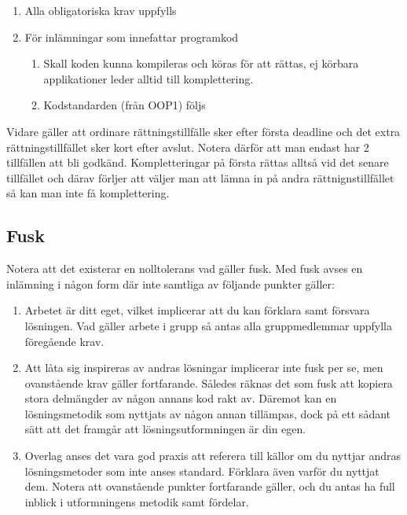 \documentclass{article}
\begin{document}
  \begin{enumerate}
    		\item Alla obligatoriska krav uppfylls
    		\item För inlämningar som innefattar programkod
    		\begin{enumerate}
    		 \item Skall koden kunna kompileras och köras för att rättas, ej körbara applikationer
    		 leder alltid till komplettering.
    		 \item Kodstandarden (från OOP1) följs
    		\end{enumerate}
    \end{enumerate}
    
    Vidare gäller att ordinare rättningstillfälle sker efter första deadline och det extra rättningstillfället sker kort efter avslut. Notera därför att man endast har 2 tillfällen att bli godkänd. Kompletteringar på första rättas alltså vid det senare tillfället och därav förljer att väljer man att lämna in på andra rättnignstillfället så kan man inte få komplettering. 
    \subsection*{Fusk}
   Notera att det existerar en nolltolerans vad gäller fusk. Med fusk avses en inlämning i någon
   form där inte samtliga av följande punkter gäller:


    \begin{enumerate}
    	          \item Arbetet är ditt eget, vilket implicerar att du kan förklara samt försvara lösningen. Vad
    	          gäller arbete i grupp så antas alla gruppmedlemmar uppfylla föregående krav.
    	          \item Att låta sig inspireras av andras lösningar implicerar inte fusk per se, men ovanstående
    	          krav gäller fortfarande. Således räknas det som fusk att kopiera stora delmängder av
    	          någon annans kod rakt av. Däremot kan en lösningsmetodik som nyttjats av någon
    	          annan tillämpas, dock på ett sådant sätt att det framgår att lösningsutformningen är
    	          din egen.
    	          \item Overlag anses det vara god praxis att referera till källor om du nyttjar andras lösningsmetoder
    	          som inte anses standard. Förklara även varför du nyttjat dem. Notera att ovanstående
    	          punkter fortfarande gäller, och du antas ha full inblick i utformningens metodik samt
    	          fördelar.
  	              
     \end{enumerate}
     
\end{document}
